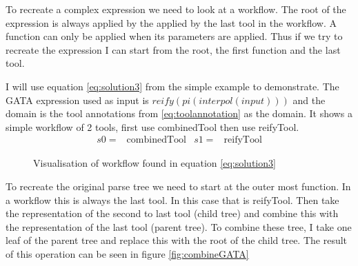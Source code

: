 \documentclass{article}
\begin{document}
To recreate a complex expression we need to look at a workflow. The root of the expression is always applied by the applied by the last tool in the workflow. A function can only be applied when its parameters are applied. Thus if we try to recreate the expression I can start from the root, the first function and the last tool. 

I will use equation \ref{eq:solution3} from the simple example to demonstrate. The GATA expression used as input is $reify(pi(interpol(input)))$ and the domain is the tool annotations from \ref{eq:toolannotation} as the domain. It shows a simple workflow of 2 tools, first use combinedTool then use reifyTool. 
\\
\begin{align}
    s0=& \text{combinedTool} & s1=&\text{reifyTool} \label{eq:solution3}
\end{align}
\begin{figure}[H]
    \centering
    \caption{Visualisation of workflow found in equation \ref{eq:solution3} }
    \label{fig:my_label}
\end{figure}

To recreate the original parse tree we need to start at the outer most function. In a workflow this is always the last tool. In this case that is reifyTool. Then take the representation of the second to last tool (child tree) and combine this with the representation of the last tool (parent tree). To combine these tree, I take one leaf of the parent tree and replace this with the root of the child tree. The result of this operation can be seen in figure \ref{fig:combineGATA}
\end{document}
